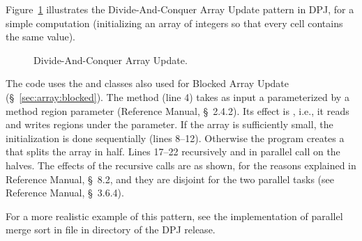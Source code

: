
 Figure~\ref{fig:array:dandc}
illustrates the Divide-And-Conquer Array Update pattern in DPJ, for a
simple computation (initializing an array of integers so that every
cell contains the same value).  

\begin{figure}

\caption{Divide-And-Conquer Array Update.}
\label{fig:array:dandc}
\end{figure}

The code uses the  and 
classes also used for Blocked Array Update
(\S~\ref{sec:array:blocked}).  The method  (line 4)
takes as input a  parameterized by a method region
parameter  (Reference Manual, \S~2.4.2).  Its effect is
, i.e., it reads and writes regions under the
parameter.  If the array is sufficiently small, the initialization is
done sequentially (lines 8--12).  Otherwise the program creates a
 that splits the array in half.  Lines 17--22
recursively and in parallel call  on the halves.
The effects of the recursive calls are as shown, for the reasons
explained in Reference Manual, \S~8.2, and they are disjoint for the
two parallel tasks (see Reference Manual, \S~3.6.4).

 For a more realistic example of this
pattern, see the implementation of parallel merge sort in file
 in directory  of the
DPJ release.


